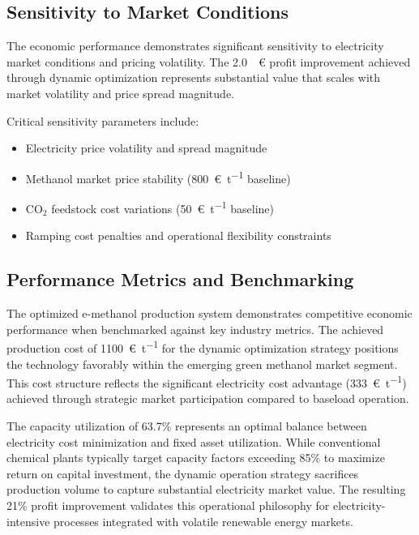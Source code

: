 \documentclass[12pt,a4paper]{article}
\begin{document}

\subsection{Sensitivity to Market Conditions}

The economic performance demonstrates significant sensitivity to electricity market conditions and pricing volatility. The \SI{2.0}{\mega\euro} profit improvement achieved through dynamic optimization represents substantial value that scales with market volatility and price spread magnitude.

Critical sensitivity parameters include:
\begin{itemize}
\item Electricity price volatility and spread magnitude
\item Methanol market price stability (\SI{800}{\euro\per\tonne} baseline)
\item CO$_2$ feedstock cost variations (\SI{50}{\euro\per\tonne} baseline)
\item Ramping cost penalties and operational flexibility constraints
\end{itemize}

\subsection{Performance Metrics and Benchmarking}

The optimized e-methanol production system demonstrates competitive economic performance when benchmarked against key industry metrics. The achieved production cost of \SI{1100}{\euro\per\tonne} for the dynamic optimization strategy positions the technology favorably within the emerging green methanol market segment. This cost structure reflects the significant electricity cost advantage (\SI{333}{\euro\per\tonne}) achieved through strategic market participation compared to baseload operation.

The capacity utilization of 63.7\% represents an optimal balance between electricity cost minimization and fixed asset utilization. While conventional chemical plants typically target capacity factors exceeding 85\% to maximize return on capital investment, the dynamic operation strategy sacrifices production volume to capture substantial electricity market value. The resulting 21\% profit improvement validates this operational philosophy for electricity-intensive processes integrated with volatile renewable energy markets.
\end{document}
